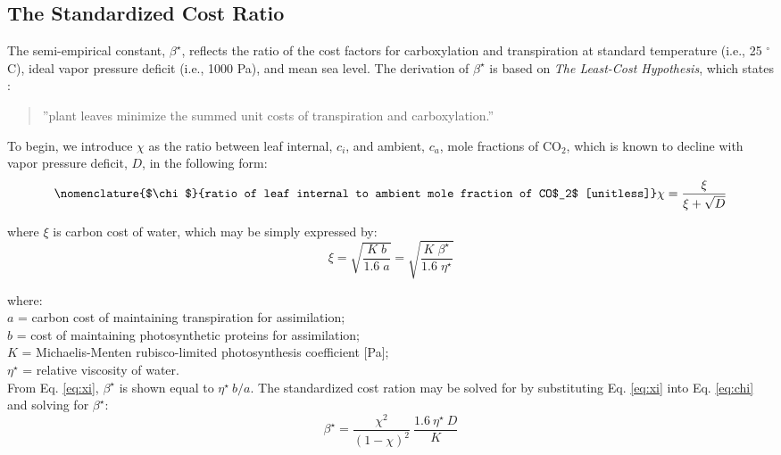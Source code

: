 \subsection{The Standardized Cost Ratio}
\label{sec:beta}
%
The semi-empirical constant, $\beta^\star$, reflects the ratio of the cost factors for carboxylation and transpiration at standard temperature (i.e., 25 ${}^\circ$C), ideal vapor pressure deficit (i.e., 1000 Pa), and mean sea level. 
The derivation of $\beta^\star$ is based on \emph{The Least-Cost Hypothesis}, which states \parencite{prentice14}:
\begin{quote}
	''plant leaves minimize the summed unit costs of transpiration and carboxylation.''
\end{quote}
To begin, we introduce $\chi$ as the ratio between leaf internal, $c_i$, and ambient, $c_a$, mole fractions of CO$_2$, which is known to decline with vapor pressure deficit, $D$, in the following form:
\begin{equation}
\nomenclature{$\chi$}{ratio of leaf internal to ambient mole fraction of CO$_2$ [unitless]}%
\label{eq:chi}
    \chi = \frac{\xi}{\xi + \sqrt{D}}
\end{equation}

\noindent where $\xi$ is carbon cost of water, which may be simply expressed by:
%
\begin{equation}
\label{eq:xi}
    \xi = \sqrt{\frac{K\; b}{1.6\; a}} = \sqrt{\frac{K\; \beta^\star}{1.6\; \eta^\star}}
\end{equation}

\noindent where:\\
\indent $a$ = carbon cost of maintaining transpiration for assimilation; \\
\indent $b$ = cost of maintaining photosynthetic proteins for assimilation;\\
\indent $K$ = Michaelis-Menten rubisco-limited photosynthesis coefficient [Pa];\\
\indent $\eta^\star$ = relative viscosity of water.\\

\noindent From Eq. \ref{eq:xi}, $\beta^\star$ is shown equal to $\eta^\star\: b/a$.
The standardized cost ration may be solved for by substituting Eq. \ref{eq:xi} into Eq. \ref{eq:chi} and solving for $\beta^\star$:
\begin{equation}
\label{eq:bstar}
    \beta^\star = \frac{\chi^2}{\left(1 - \chi \right)^2}\: \frac{1.6\: \eta^\star\: D}{K}
\end{equation}


